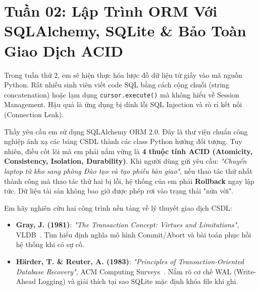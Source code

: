 \section{Tuần 02: Lập Trình ORM Với SQLAlchemy, SQLite \& Bảo Toàn Giao Dịch ACID}
\label{sec:tuan_02}

\begin{advisorbox}
Trong tuần thứ 2, em sẽ hiện thực hóa lược đồ dữ liệu từ giấy vào mã nguồn Python. Rất nhiều sinh viên viết code SQL bằng cách cộng chuỗi (string concatenation) hoặc lạm dụng \texttt{cursor.execute()} mà không hiểu về Session Management. Hậu quả là ứng dụng bị dính lỗi SQL Injection và rò rỉ kết nối (Connection Leak).

Thầy yêu cầu em sử dụng SQLAlchemy ORM 2.0. Đây là thư viện chuẩn công nghiệp ánh xạ các bảng CSDL thành các class Python hướng đối tượng. Tuy nhiên, điều cốt lõi mà em phải nắm vững là \textbf{4 thuộc tính ACID (Atomicity, Consistency, Isolation, Durability)}. Khi người dùng gửi yêu cầu: \textit{"Chuyển laptop từ kho sang phòng Đào tạo và tạo phiếu bàn giao"}, nếu thao tác thứ nhất thành công mà thao tác thứ hai bị lỗi, hệ thống của em phải \textbf{Rollback} ngay lập tức. Dữ liệu tài sản không bao giờ được phép rơi vào trạng thái "nửa vời".
\end{advisorbox}

\begin{literaturebox}
Em hãy nghiên cứu hai công trình nền tảng về lý thuyết giao dịch CSDL:
\begin{itemize}[leftmargin=1.5em]
    \item \textbf{Gray, J. (1981)}: \textit{"The Transaction Concept: Virtues and Limitations"}, VLDB~\cite{gray1981transaction}. Tìm hiểu định nghĩa mô hình Commit/Abort và bài toán phục hồi hệ thống khi có sự cố.
    \item \textbf{Härder, T. \& Reuter, A. (1983)}: \textit{"Principles of Transaction-Oriented Database Recovery"}, ACM Computing Surveys~\cite{haerder1983acid}. Nắm rõ cơ chế WAL (Write-Ahead Logging) và giải thích tại sao SQLite mặc định khóa file khi ghi.
\end{itemize}
\end{literaturebox}

